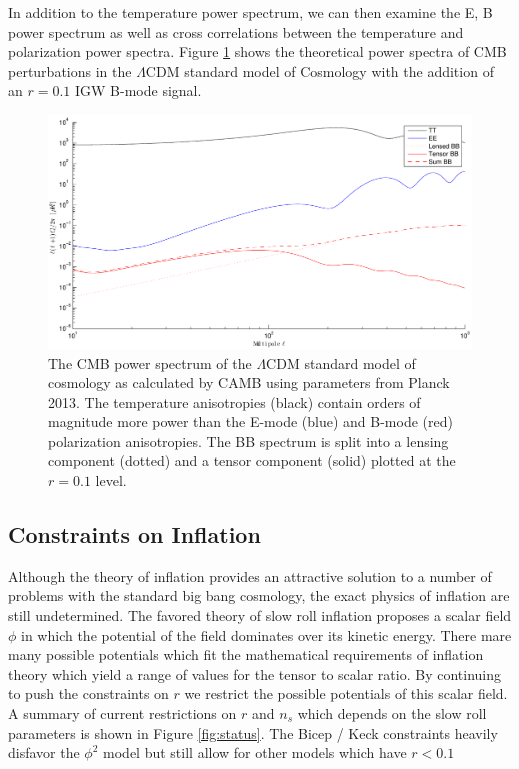 \documentclass[12pt]{article}
\begin{document}
In addition to the temperature power spectrum, we can then examine the
E, B power spectrum as well as cross correlations between the temperature and
polarization power spectra. Figure \ref{fig:theory_aps} shows the
theoretical power spectra of CMB perturbations in the $\Lambda$CDM standard
model of Cosmology with the addition of an $r=0.1$ IGW B-mode signal. 



\begin{figure}[ht]
	\center
	\includegraphics[width=.8\textwidth]{theory_aps.pdf}
	\caption{The CMB power spectrum of the $\Lambda$CDM standard model of
	cosmology as calculated by CAMB using parameters from Planck 2013. The
	temperature anisotropies (black) contain orders of magnitude more power
	than the E-mode (blue) and B-mode (red) polarization anisotropies. The BB
	spectrum is split into a lensing component (dotted) and a tensor component
	(solid) plotted at the $r=0.1$ level.}
	\label{fig:theory_aps}

\end{figure}


\subsection{Constraints on Inflation}
Although the theory of inflation provides an attractive solution to a number
of problems with the standard big bang cosmology, the exact physics of
inflation are still undetermined. The favored theory of slow roll inflation
proposes a scalar field $\phi$ in which the potential of the field dominates
over its kinetic energy. There mare many possible potentials which fit the
mathematical requirements of inflation theory which yield a range of values
for the tensor to scalar ratio. By continuing to push the constraints on $r$
we restrict the possible potentials of this scalar field. A summary of current
restrictions on $r$ and $n_s$ which depends on the slow roll parameters is
shown in Figure \ref{fig:status}. The Bicep / Keck constraints heavily
disfavor the $\phi ^2$ model but still allow for other models which have
$r<0.1$
\end{document}
